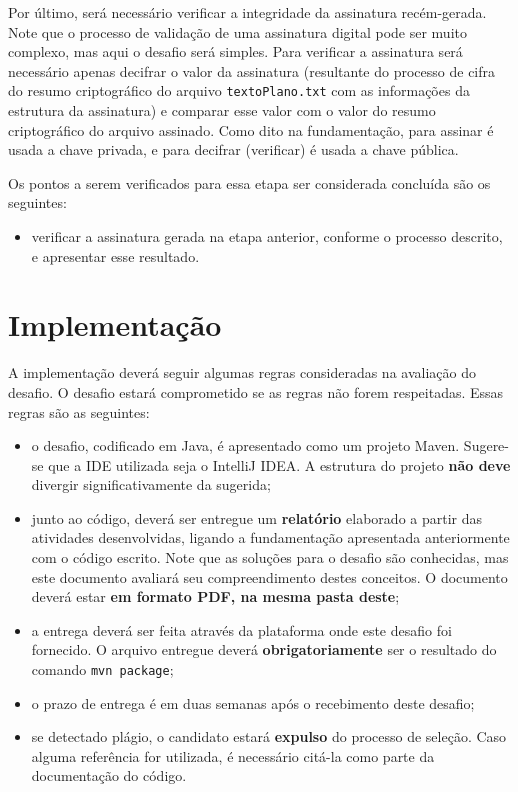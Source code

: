 \documentclass{article}
\begin{document}
Por último, será necessário verificar a integridade da assinatura
recém-gerada. Note que o processo de validação de uma assinatura digital pode
ser muito complexo, mas aqui o desafio será simples. Para verificar
a assinatura será necessário apenas decifrar o valor da assinatura (resultante
do processo de cifra do resumo criptográfico do arquivo \texttt{textoPlano.txt}
com as informações da estrutura da assinatura) e comparar esse valor com
o valor do resumo criptográfico do arquivo assinado. Como dito na
fundamentação, para assinar é usada a chave privada, e para decifrar
(verificar) é usada a chave pública.

Os pontos a serem verificados para essa etapa ser considerada concluída são os
seguintes:

\begin{itemize}
  \item verificar a assinatura gerada na etapa anterior, conforme o
      processo descrito, e apresentar esse resultado.
\end{itemize}

\section{Implementação}\label{sec:impl}

A implementação deverá seguir algumas regras consideradas na avaliação do
desafio. O desafio estará comprometido se as regras não forem
respeitadas. Essas regras são as seguintes:

\begin{itemize}
  \item o desafio, codificado em Java, é apresentado como um projeto
      Maven. Sugere-se que a IDE utilizada seja o IntelliJ IDEA\@. A estrutura
        do projeto \textbf{não deve} divergir significativamente da sugerida;

  \item junto ao código, deverá ser entregue um \textbf{relatório} elaborado
      a partir das atividades desenvolvidas, ligando a fundamentação
        apresentada anteriormente com o código escrito. Note que as soluções
        para o desafio são conhecidas, mas este documento avaliará seu
        compreendimento destes conceitos. O documento deverá estar \textbf{em
        formato PDF, na mesma pasta deste};

  \item a entrega deverá ser feita através da plataforma onde este desafio foi
      fornecido. O arquivo entregue deverá \textbf{obrigatoriamente} ser
        o resultado do comando \texttt{mvn package};

  \item o prazo de entrega é em duas semanas após o recebimento deste desafio;

  \item se detectado plágio, o candidato estará \textbf{expulso} do processo de
      seleção. Caso alguma referência for utilizada, é necessário citá-la como
        parte da documentação do código.
\end{itemize}
\end{document}
